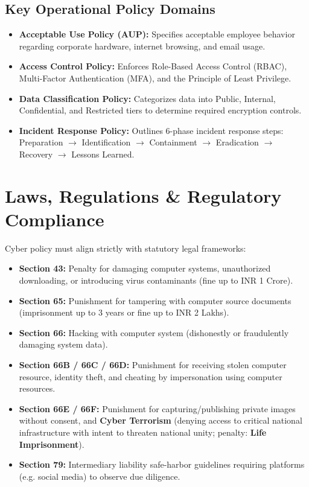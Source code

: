 \documentclass[12pt,a4paper]{article}
\begin{document}
\subsection{Key Operational Policy Domains}
\begin{itemize}[leftmargin=*, itemsep=3pt]
  \item \textbf{Acceptable Use Policy (AUP):} Specifies acceptable employee behavior regarding corporate hardware, internet browsing, and email usage.
  \item \textbf{Access Control Policy:} Enforces Role-Based Access Control (RBAC), Multi-Factor Authentication (MFA), and the Principle of Least Privilege.
  \item \textbf{Data Classification Policy:} Categorizes data into Public, Internal, Confidential, and Restricted tiers to determine required encryption controls.
  \item \textbf{Incident Response Policy:} Outlines 6-phase incident response steps: Preparation $\to$ Identification $\to$ Containment $\to$ Eradication $\to$ Recovery $\to$ Lessons Learned.
\end{itemize}

\section{Laws, Regulations \& Regulatory Compliance}

Cyber policy must align strictly with statutory legal frameworks:

\begin{tcolorbox}[defbox, title={\textbf{Detailed Indian IT Act 2000 Section Breakdown}}]
\begin{itemize}[leftmargin=*, itemsep=3pt]
  \item \textbf{Section 43:} Penalty for damaging computer systems, unauthorized downloading, or introducing virus contaminants (fine up to INR 1 Crore).
  \item \textbf{Section 65:} Punishment for tampering with computer source documents (imprisonment up to 3 years or fine up to INR 2 Lakhs).
  \item \textbf{Section 66:} Hacking with computer system (dishonestly or fraudulently damaging system data).
  \item \textbf{Section 66B / 66C / 66D:} Punishment for receiving stolen computer resource, identity theft, and cheating by impersonation using computer resources.
  \item \textbf{Section 66E / 66F:} Punishment for capturing/publishing private images without consent, and \textbf{Cyber Terrorism} (denying access to critical national infrastructure with intent to threaten national unity; penalty: \textbf{Life Imprisonment}).
  \item \textbf{Section 79:} Intermediary liability safe-harbor guidelines requiring platforms (e.g. social media) to observe due diligence.
\end{itemize}
\end{tcolorbox}
\end{document}
